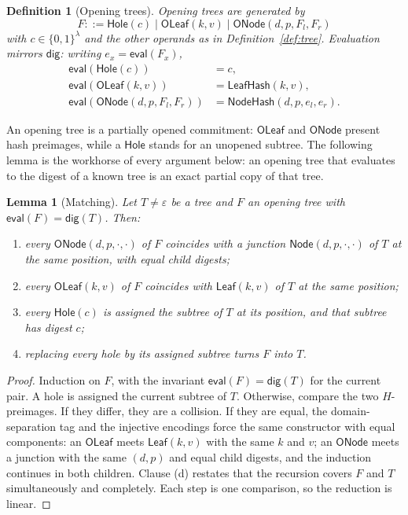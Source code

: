\documentclass[11pt]{article}
\newtheorem{definition}{Definition}
\newtheorem{lemma}{Lemma}
\begin{document}
\begin{definition}[Opening trees]
\label{def:opening}
Opening trees are generated by
\[ F ::= \mathsf{Hole}(c) \mid \mathsf{OLeaf}(k, v) \mid \mathsf{ONode}(d, p, F_l, F_r) \]
with $c \in \{0,1\}^{\lambda}$ and the other operands as in Definition~\ref{def:tree}. Evaluation mirrors $\mathsf{dig}$: writing $e_x = \mathsf{eval}(F_x)$,
\begin{align*}
\mathsf{eval}(\mathsf{Hole}(c)) &= c,\\
\mathsf{eval}(\mathsf{OLeaf}(k,v)) &= \mathsf{LeafHash}(k,v),\\
\mathsf{eval}(\mathsf{ONode}(d,p,F_l,F_r)) &= \mathsf{NodeHash}(d,p,e_l,e_r).
\end{align*}
\end{definition}

An opening tree is a partially opened commitment: $\mathsf{OLeaf}$ and $\mathsf{ONode}$ present hash preimages, while a $\mathsf{Hole}$ stands for an unopened subtree. The following lemma is the workhorse of every argument below: an opening tree that evaluates to the digest of a known tree is an exact partial copy of that tree.

\begin{lemma}[Matching]
\label{lem:match}
Let $T \neq \varepsilon$ be a tree and $F$ an opening tree with $\mathsf{eval}(F) = \mathsf{dig}(T)$. Then:
\begin{enumerate}[nosep,label=(\alph*)]
  \item every $\mathsf{ONode}(d,p,\cdot,\cdot)$ of $F$ coincides with a junction $\mathsf{Node}(d,p,\cdot,\cdot)$ of $T$ at the same position, with equal child digests;
  \item every $\mathsf{OLeaf}(k,v)$ of $F$ coincides with $\mathsf{Leaf}(k,v)$ of $T$ at the same position;
  \item every $\mathsf{Hole}(c)$ is \emph{assigned} the subtree of $T$ at its position, and that subtree has digest $c$;
  \item replacing every hole by its assigned subtree turns $F$ into $T$.
\end{enumerate}
\end{lemma}
\begin{proof}
Induction on $F$, with the invariant $\mathsf{eval}(F) = \mathsf{dig}(T)$ for the current pair. A hole is assigned the current subtree of $T$. Otherwise, compare the two $H$-preimages. If they differ, they are a collision. If they are equal, the domain-separation tag and the injective encodings force the same constructor with equal components: an $\mathsf{OLeaf}$ meets $\mathsf{Leaf}(k,v)$ with the same $k$ and $v$; an $\mathsf{ONode}$ meets a junction with the same $(d,p)$ and equal child digests, and the induction continues in both children. Clause (d) restates that the recursion covers $F$ and $T$ simultaneously and completely. Each step is one comparison, so the reduction is linear.
\end{proof}
\end{document}
